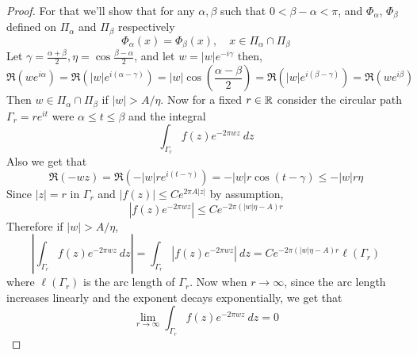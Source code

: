 \begin{proof}
  For that we'll show that for any $\alpha, \beta$ such that $0< \beta -\alpha < \pi$, and $\Phi_\alpha$, $\Phi_\beta$ defined on $\Pi_\alpha$ and $\Pi_\beta$ respectively $$\Phi_\alpha(x) = \Phi_\beta(x), \quad x \in \Pi_\alpha \cap \Pi_\beta$$
  Let $\gamma = \frac{\alpha+\beta}{2}, \eta = \cos\frac{\beta-\alpha}{2}$, and let $w = |w|e^{-i\gamma}$ then, $$\Re(we^{i\alpha}) =\Re(|w|e^{i(\alpha-\gamma)}) = |w|\cos\left(\frac{\alpha-\beta}{2}\right) = \Re(|w|e^{i(\beta-\gamma)}) = \Re(we^{i\beta})$$
  Then $w \in \Pi_\alpha \cap \Pi_\beta$ if $|w| > A / \eta$. Now for a fixed $r \in \mathbb R$ consider the circular path $\Gamma_r = re^{it}$ were $\alpha \le t \le \beta$ and the integral $$\int_{\Gamma_r} f(z)e^{-2\pi wz} \ dz$$
  Also we get that $$\Re(-wz) = \Re(-|w|re^{i(t-\gamma)}) = -|w|r \cos(t-\gamma)\le -|w|r\eta$$ 
  Since $|z| = r$ in $\Gamma_r$ and $|f(z)| \le Ce^{2\pi A |z|}$ by assumption, $$|f(z)e^{-2\pi wz}| \le Ce^{-2\pi (|w|\eta - A) r}$$
  Therefore if $|w| > A / \eta$, $$\left|\int_{\Gamma_r} f(z) e^{-2 \pi wz} \ dz \right| = \int_{\Gamma_r} \left|f(z) e^{-2 \pi wz}\right| \ dz = Ce^{-2\pi (|w|\eta -A)r} \ell(\Gamma_r)$$
  where $\ell(\Gamma_r)$ is the arc length of $\Gamma_r$. Now when $r \to \infty$, since the arc length increases linearly and the exponent decays exponentially, we get that $$\lim_{r\to \infty} \int_{\Gamma_r} f(z)e^{-2\pi w z} \ dz = 0$$
\end{proof}

